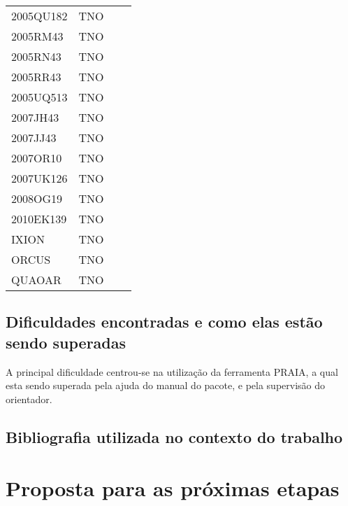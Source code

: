 \documentclass[a4paper, 11pt]{article}
\begin{document}
\begin{table}
\begin{center}
{\begin{tabular}{|l|c|c|c|}
2005QU182   &  TNO &      &    \\
2005RM43    &  TNO &      &    \\
2005RN43    &  TNO &      &    \\
2005RR43    &  TNO &      &    \\
2005UQ513   &  TNO &      &    \\
2007JH43    &  TNO &      &    \\
2007JJ43    &  TNO &      &    \\
2007OR10    &  TNO &      &    \\
2007UK126   &  TNO &      &    \\
2008OG19    &  TNO &      &    \\
2010EK139   &  TNO &      &    \\
IXION       &  TNO &      &    \\
ORCUS       &  TNO &      &    \\
QUAOAR      &  TNO &      &    \\
\hline
\end{tabular}}
\label{table:incerteza}
\end{center}
\end{table}

\subsection{Dificuldades encontradas e como elas estão sendo superadas}
A principal dificuldade centrou-se na utilização da ferramenta PRAIA, a qual esta sendo superada pela ajuda do manual do pacote, e pela supervisão do orientador.  

\subsection{Bibliografia utilizada no contexto do trabalho}

\section{Proposta para as próximas etapas}
\end{document}
